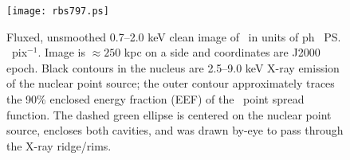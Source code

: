 \begin{figure}
  \begin{center}
    \begin{minipage}{\linewidth}
      \texttt{[image: rbs797.ps]}
    \end{minipage}
    \caption{Fluxed, unsmoothed 0.7--2.0 keV clean image of \rbs\ in
      units of ph \pcmsq\ \ps\ pix$^{-1}$. Image is $\approx 250$ kpc
      on a side and coordinates are J2000 epoch. Black contours in the
      nucleus are 2.5--9.0 keV X-ray emission of the nuclear point
      source; the outer contour approximately traces the 90\% enclosed
      energy fraction (EEF) of the \cxo\ point spread function. The
      dashed green ellipse is centered on the nuclear point source,
      encloses both cavities, and was drawn by-eye to pass through the
      X-ray ridge/rims.}
    \label{fig:img}
  \end{center}
\end{figure}

